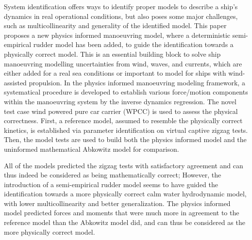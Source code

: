 
System identification offers ways to identify proper models to describe a ship's dynamics in real operational conditions, but also poses some major challenges, such as multicollinearity and generality of the identified model. 
This paper proposes a new physics informed manoeuvring model, where a deterministic semi-empirical rudder model has been added, to guide the identification towards a physically correct model.  
This is an essential building block to solve ship manoeuvring modelling uncertainties from wind, waves, and currents, which are either added for a real sea conditions or important to model for ships with wind-assisted propulsion.
In the physics informed manoeuvring modeling framework, a systematical procedure is developed to establish various force/motion components within the manoeuvring system by the inverse dynamics regression. 
The novel test case wind powered pure car carrier (WPCC) is used to assess the physical correctness. First, a reference model, assumed to resemble the physically correct kinetics, is established via parameter identification on virtual captive zigzag tests. Then, the model tests are used to build both the physics informed model and the uninformed mathematical Abkowitz model for comparison.


All of the models predicted the zigzag tests with satisfactory agreement and can thus indeed be considered as being mathematically correct; However, the introduction of a semi-empirical rudder model seems to have guided the identification towards a more physically correct calm water hydrodynamic model, with lower multicollinearity and better generalization. The physics informed model predicted forces and moments that were much more in agreement to the reference model than the Abkowitz model did, and can thus be considered as the more physically correct model. 

